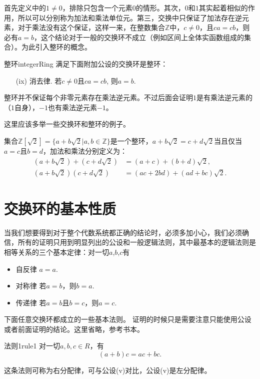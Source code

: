 首先定义中的$1 \neq 0$，排除只包含一个元素$0$的情形。其次，$0$和$1$其实起着相似的作用，所以可以分别称为加法和乘法单位元。第三，交换中只保证了加法存在逆元素，对于乘法没有这个保证，这样一来，在整数集合$\mathbb{Z}$中，$c \neq 0$，且$ca=cb$，则必有$a=b$，这个结论对于一般的交换环不成立（例如区间上全体实函数组成的集合）。为此引入整环的概念。
\begin{definition}{整环}{integerRing} 
满足下面附加公设的交换环是整环：
\begin{enumerate}
\item[(ix)] 消去律. 若$c \neq 0$且$ca=cb$, 则$a=b$.
\end{enumerate}
\end{definition}

整环并不保证每个非零元素存在乘法逆元素。不过后面会证明$1$是有乘法逆元素的（$1$自身），$-1$也有乘法逆元素$-1$。

这里应该多举一些交换环和整环的例子。

集合$\mathbb{Z}[\sqrt{2}] = \{a+b\sqrt{2} | a,b \in \mathbb{Z}\}$是一个整环，$a+b\sqrt{2}=c+d\sqrt{2}$当且仅当$a=c$且$b=d$，加法和乘法分别定义为：
\[
\begin{aligned}
(a + b\sqrt{2}) + (c + d\sqrt{2}) &= (a+c) + (b+d)\sqrt{2}, \\
(a + b\sqrt{2})(c + d\sqrt{2})&=(ac+2bd)+(ad+bc)\sqrt{2}.
\end{aligned}
\]


\section{交换环的基本性质}\label{subsection0010102}
当我们想要得到对于整个代数系统都正确的结论时，必须多加小心，我们必须确信，所有的证明只用到明显列出的公设和一般逻辑法则，其中最基本的逻辑法则是相等关系的三个基本定律：对一切$a$,$b$,$c$有
\begin{itemize}
\item 自反律 $a=a$.
\item 对称律 若$a=b$，则$b=a$.
\item 传递律 若$a=b$且$b=c$，则$a=c$.
\end{itemize}

下面任意交换环都成立的一些基本法则。 证明的时候只是需要注意只能使用公设或者前面证明的结论。这里省略，参考书本。

\begin{corollary}{法则1}{rule1}
对一切$a,b,c \in R$，有
\[
(a+b)c = ac + bc.
\]
\end{corollary}

这条法则可称为右分配律，可与公设(v)对比，公设(v)是左分配律。

